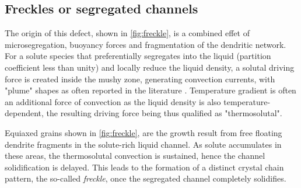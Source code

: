 



\subsection*{Freckles or segregated channels} 
 
The origin of this defect, shown in \cref{fig:freckle}, is a combined effet of microsegregation, buoyancy forces and
fragmentation of the dendritic network. 
For a solute species that preferentially segregates into the liquid (partition coefficient less than unity)
and locally reduce the liquid density, a solutal driving force is created inside the mushy zone, generating convection currents, 
with "plume" shapes as often reported in the literature \citep{sarazin_studies_1992, schneider_modeling_1997,
saad_simulation_2015}. Temperature gradient is often an additional force of convection as the liquid density is also temperature-dependent, 
the resulting driving force being thus qualified as "thermosolutal". 

Equiaxed grains shown in \cref{fig:freckle}, are the growth result from free floating dendrite fragments in the solute-rich liquid channel. 
As solute accumulates in these areas, the thermosolutal convection is sustained, hence the channel solidification is delayed. 
This leads to the formation of a distinct crystal chain pattern, the so-called \emph{freckle}, once the segregated channel completely solidifies.  


